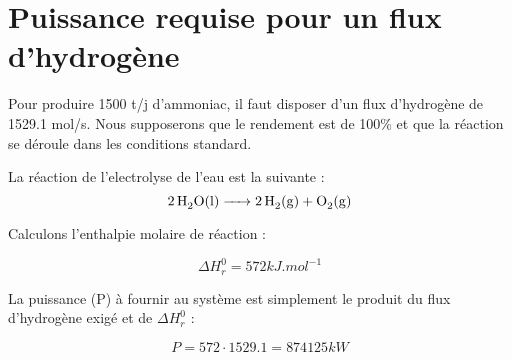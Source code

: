 \documentclass[10pt,a4paper]{article}
\begin{document}
\section{Puissance requise pour un flux d'hydrogène}

Pour produire 1500 t/j d'ammoniac, il faut disposer d'un flux d'hydrogène de 1529.1 mol/s. Nous supposerons que le rendement est de 100\% et que la réaction se déroule dans les conditions standard. 

La réaction de l'electrolyse de l'eau est la suivante : $$\ce {2H2O(l) -> 2H2(g) + O2(g)}$$ 

Calculons l'enthalpie molaire de réaction :

$$ \Delta H_r^0 =  \unit{572}{kJ.mol^{-1}} $$

La puissance (P) à fournir au système est simplement le produit du flux d'hydrogène exigé et de $ \Delta H_r^0$ :

$$ P = 572\cdot1529.1 = \unit{874 125}{kW} $$
\end{document}
